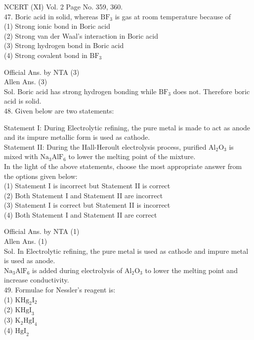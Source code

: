 \documentclass[10pt]{article}
\begin{document}
NCERT (XI) Vol. 2 Page No. 359, 360.\\
47. Boric acid in solid, whereas \(\mathrm{BF}_{3}\) is gas at room temperature because of\\
(1) Strong ionic bond in Boric acid\\
(2) Strong van der Waal's interaction in Boric acid\\
(3) Strong hydrogen bond in Boric acid\\
(4) Strong covalent bond in \(\mathrm{BF}_{3}\)

Official Ans. by NTA (3)\\
Allen Ans. (3)\\
Sol. Boric acid has strong hydrogen bonding while \(\mathrm{BF}_{3}\) does not. Therefore boric acid is solid.\\
48. Given below are two statements:

Statement I: During Electrolytic refining, the pure metal is made to act as anode and its impure metallic form is used as cathode.\\
Statement II: During the Hall-Heroult electrolysis process, purified \(\mathrm{Al}_{2} \mathrm{O}_{3}\) is mixed with \(\mathrm{Na}_{3} \mathrm{AlF}_{6}\) to lower the melting point of the mixture.\\
In the light of the above statements, choose the most appropriate answer from the options given below:\\
(1) Statement I is incorrect but Statement II is correct\\
(2) Both Statement I and Statement II are incorrect\\
(3) Statement I is correct but Statement II is incorrect\\
(4) Both Statement I and Statement II are correct

Official Ans. by NTA (1)\\
Allen Ans. (1)\\
Sol. In Electrolytic refining, the pure metal is used as cathode and impure metal is used as anode.\\
\(\mathrm{Na}_{3} \mathrm{AlF}_{6}\) is added during electrolysis of \(\mathrm{Al}_{2} \mathrm{O}_{3}\) to lower the melting point and increase conductivity.\\
49. Formulae for Nessler's reagent is:\\
(1) \(\mathrm{KHg}_{2} \mathrm{I}_{2}\)\\
(2) \(\mathrm{KHgI}_{3}\)\\
(3) \(\mathrm{K}_{2} \mathrm{HgI}_{4}\)\\
(4) \(\mathrm{HgI}_{2}\)
\end{document}
